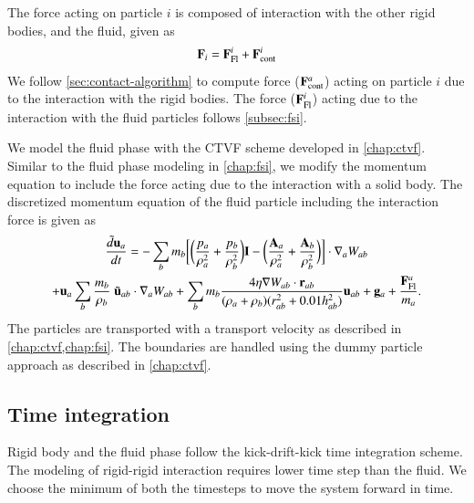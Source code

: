 The force acting on particle $i$ is composed of interaction with the other rigid
bodies, and the fluid, given as
\begin{eqnarray}
  \label{eq:rfc:rb_particle_pos_update}
  \mathbf{F}_i = \mathbf{F}_{\text{Fl}}^i + \mathbf{F}_{\text{cont}}^i
\end{eqnarray}
We follow \cref{sec:contact-algorithm} to compute force
($\mathbf{F}_{\text{cont}}^a$) acting on particle $i$ due to the interaction with
the rigid bodies. The force ($\mathbf{F}_{\text{Fl}}^i$) acting due to the
interaction with the fluid particles follows \cref{subsec:fsi}.

We model the fluid phase with the CTVF \citep{adepu2021corrected} scheme
developed in \cref{chap:ctvf}. Similar to the fluid phase modeling in
\cref{chap:fsi}, we modify the momentum equation to include the force acting due
to the interaction with a solid body. The discretized momentum equation of the
fluid particle including the interaction force is given as
\begin{multline}
  \label{eq:rfc:sph-momentum-fluid}
  \frac{\tilde{d}\mathbf{u}_{a}}{dt} = - \sum_{b} m_b \bigg[
  \bigg(\frac{p_a}{\rho_a^2} + \frac{p_b}{\rho_b^2}\bigg) \mathbf{I} -
  \bigg(\frac{\mathbf{A}_a}{\rho_a^2} + \frac{\mathbf{A}_b}{\rho_b^2}
  \bigg) \bigg]
  \cdot \nabla_{a} W_{ab} \\
  + \mathbf{u}_{a} \sum_{b} \frac{m_b}{\rho_{b}} \; \tilde{\mathbf{u}}_{ab} \cdot
  \nabla_{a} W_{ab} + \sum_{b} m_b \frac{4 \eta \nabla W_{ab}\cdot
    \mathbf{r}_{ab}}{(\rho_a + \rho_b) (r_{ab}^2 + 0.01 h_{ab}^2)} \mathbf{u}_{ab} +
  \mathbf{g}_{a} + \frac{\mathbf{F}^a_{\text{Fl}}}{m_a}.
\end{multline}
The particles are transported with a transport velocity as described in
\cref{chap:ctvf,chap:fsi}. The boundaries are handled using the dummy particle
approach as described in \cref{chap:ctvf}.

\subsection{Time integration}

Rigid body and the fluid phase follow the kick-drift-kick time integration
scheme. The modeling of rigid-rigid interaction requires lower time step than the fluid. We choose the minimum of both the timesteps to move the system forward
in time.

